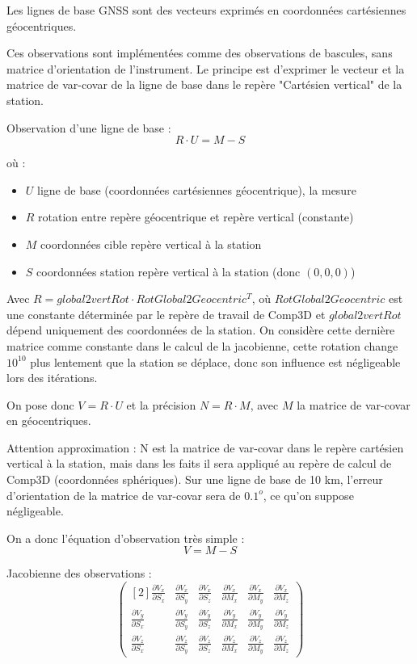 \documentclass[french]{report}
\begin{document}
Les lignes de base GNSS sont des vecteurs exprimés en coordonnées cartésiennes géocentriques.

Ces observations sont implémentées comme des observations de bascules, sans matrice d'orientation
de l'instrument.
Le principe est d'exprimer le vecteur et la matrice de var-covar de la ligne de base dans le repère "Cartésien vertical" de la station.

Observation d'une ligne de base :
$$R \cdot U = M - S$$

où :
\begin{itemize}
\item $U$ ligne de base (coordonnées cartésiennes géocentrique), la mesure
\item $R$ rotation entre repère géocentrique et repère vertical (constante)
\item $M$ coordonnées cible repère vertical à la station
\item $S$ coordonnées station repère vertical à la station (donc $(0,0,0)$)
\end{itemize}

Avec $R = global2vertRot \cdot RotGlobal2Geocentric^T$, où $RotGlobal2Geocentric$ est une constante déterminée par le repère de travail de Comp3D et $global2vertRot$ dépend uniquement des coordonnées de la station. On considère cette dernière matrice comme constante dans le calcul de la jacobienne, cette rotation change $10^{10}$ plus lentement que la station se déplace, donc son influence est négligeable lors des itérations.

On pose donc $V = R \cdot U $ et la précision $N = R \cdot M$, avec $M$ la matrice de var-covar en géocentriques.

Attention approximation : N est la matrice de var-covar dans le repère cartésien vertical à la station, mais dans les faits il sera appliqué au repère de calcul de Comp3D (coordonnées sphériques). Sur une ligne de base de 10 km, l'erreur d'orientation de la matrice de var-covar sera de $0.1^o$, ce qu'on suppose négligeable.

On a donc l'équation d'observation très simple :
$$V = M - S$$

\vspace{0.3cm}
Jacobienne des observations :
$$\begin{pmatrix}[2]
\frac{\partial{V_x}}{\partial{S_x}} & \frac{\partial{V_x}}{\partial{S_y}} & \frac{\partial{V_x}}{\partial{S_z}} & \frac{\partial{V_x}}{\partial{M_x}} & \frac{\partial{V_x}}{\partial{M_y}} & \frac{\partial{V_x}}{\partial{M_z}} \\
\frac{\partial{V_y}}{\partial{S_x}} & \frac{\partial{V_y}}{\partial{S_y}} & \frac{\partial{V_y}}{\partial{S_z}} & \frac{\partial{V_y}}{\partial{M_x}} & \frac{\partial{V_y}}{\partial{M_y}} & \frac{\partial{V_y}}{\partial{M_z}} \\
\frac{\partial{V_z}}{\partial{S_x}} & \frac{\partial{V_z}}{\partial{S_y}} & \frac{\partial{V_z}}{\partial{S_z}} & \frac{\partial{V_z}}{\partial{M_x}} & \frac{\partial{V_z}}{\partial{M_y}} & \frac{\partial{V_z}}{\partial{M_z}}
\end{pmatrix}$$
\end{document}
